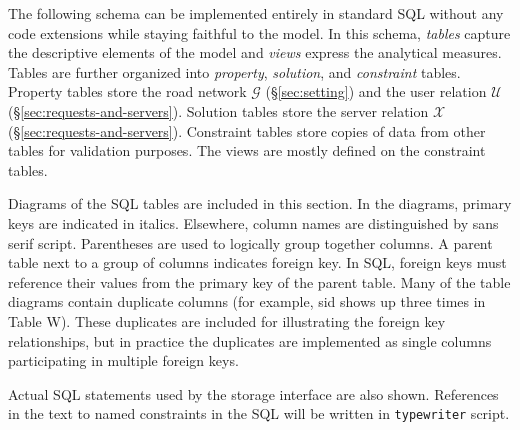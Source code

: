 \documentclass{article}
\theoremstyle{definition}
\begin{document}
The following schema can be implemented entirely in standard SQL without any
code extensions while staying faithful to the model.  In this schema,
\textit{tables} capture the descriptive elements of the model and
\textit{views} express the analytical measures.  Tables are further organized
into \emph{property}, \emph{solution}, and \emph{constraint} tables.  Property
tables store the road network $\mathcal{G}$ (\S\ref{sec:setting}) and the user
relation $\mathcal{U}$ (\S\ref{sec:requests-and-servers}).  Solution tables
store the server relation $\mathcal{X}$ (\S\ref{sec:requests-and-servers}).
Constraint tables store copies of data from other tables for validation
purposes.  The views are mostly defined on the constraint tables.

Diagrams of the SQL tables are included in this section. In the diagrams,
primary keys are indicated in italics. Elsewhere, column names are
distinguished by \textsf{sans serif} script.  Parentheses are used to logically
group together columns.  A parent table next to a group of columns indicates
foreign key. In SQL, foreign keys must reference their values from the primary
key of the parent table. Many of the table diagrams contain duplicate columns
(for example, \textsf{sid} shows up three times in Table W).  These duplicates
are included for illustrating the foreign key relationships, but in practice
the duplicates are implemented as single columns participating in multiple
foreign keys.

Actual SQL statements used by the storage interface are also shown. References
in the text to named constraints in the SQL will be written in {\tt{}typewriter}
script.
\end{document}
